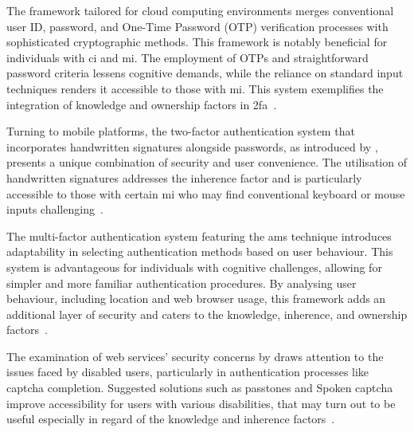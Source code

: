 The framework tailored for cloud computing environments merges conventional user ID, password, and One-Time Password (OTP) verification processes with sophisticated cryptographic methods. This framework is notably beneficial for individuals with \ac{ci} and \ac{mi}. The employment of OTPs and straightforward password criteria lessens cognitive demands, while the reliance on standard input techniques renders it accessible to those with \ac{mi}. This system exemplifies the integration of knowledge and ownership factors in \ac{2fa}~\cite{kaur_2022}.

Turning to mobile platforms, the two-factor authentication system that incorporates handwritten signatures alongside passwords, as introduced by \citeauthor{khan_2015}, presents a unique combination of security and user convenience. The utilisation of handwritten signatures addresses the inherence factor and is particularly accessible to those with certain \ac{mi} who may find conventional keyboard or mouse inputs challenging~\cite{khan_2015}.

The multi-factor authentication system featuring the \ac{ams} technique introduces adaptability in selecting authentication methods based on user behaviour. This system is advantageous for individuals with cognitive challenges, allowing for simpler and more familiar authentication procedures. By analysing user behaviour, including location and web browser usage, this framework adds an additional layer of security and caters to the knowledge, inherence, and ownership factors~\cite{mostafa_2023}.

The examination of web services' security concerns by \citeauthor{zezulak_2023} draws attention to the issues faced by disabled users, particularly in authentication processes like \ac{captcha} completion. Suggested solutions such as passtones and Spoken \ac{captcha}  improve accessibility for users with various disabilities, that may turn out to be useful especially in regard of the knowledge and inherence factors~\cite{zezulak_2023}.

